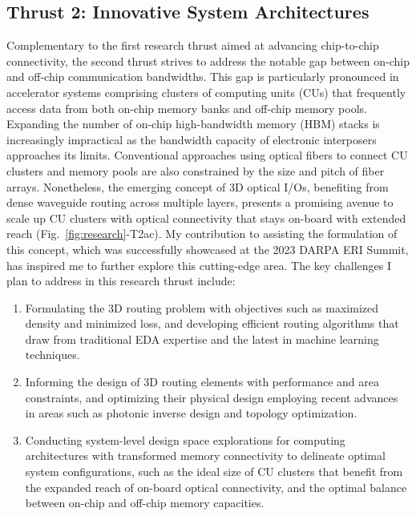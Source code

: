 \subsection{Thrust 2: Innovative System Architectures}
Complementary to the first research thrust aimed at advancing chip-to-chip connectivity, the second thrust strives to address the notable gap between on-chip and off-chip communication bandwidths. This gap is particularly pronounced in accelerator systems comprising clusters of computing units (CUs) that frequently access data from both on-chip memory banks and off-chip memory pools. Expanding the number of on-chip high-bandwidth memory (HBM) stacks is increasingly impractical as the bandwidth capacity of electronic interposers approaches its limits. Conventional approaches using optical fibers to connect CU clusters and memory pools are also constrained by the size and pitch of fiber arrays. Nonetheless, the emerging concept of 3D optical I/Os, benefiting from dense waveguide routing across multiple layers, presents a promising avenue to scale up CU clusters with optical connectivity that stays on-board with extended reach (Fig.~\ref{fig:research}-T2a\textendash c). My contribution to assisting the formulation of this concept, which was successfully showcased at the 2023 DARPA ERI Summit, has inspired me to further explore this cutting-edge area. The key challenges I plan to address in this research thrust include:
\begin{enumerate}[nosep]
    \item Formulating the 3D routing problem with objectives such as maximized density and minimized loss, and developing efficient routing algorithms that draw from traditional EDA expertise and the latest in machine learning techniques.
    \item Informing the design of 3D routing elements with performance and area constraints, and optimizing their physical design employing recent advances in areas such as photonic inverse design and topology optimization.
    \item Conducting system-level design space explorations for computing architectures with transformed memory connectivity to delineate optimal system configurations, such as the ideal size of CU clusters that benefit from the expanded reach of on-board optical connectivity, and the optimal balance between on-chip and off-chip memory capacities.
\end{enumerate}

